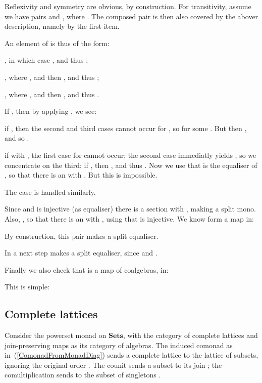 \documentclass{LMCS}
\newenvironment{myproof}[1][Proof]{ \begin{trivlist}\item[\hskip \labelsep {\bfseries #1}]}{ \end{trivlist}}
\newcommand{\Cat}[1]{\ensuremath{\mathbf{#1}}}
\newcommand{\Sets}{\Cat{Sets}\xspace}
\begin{document}
\begin{myproof}
{\noindent Reflexivity and symmetry are obvious, by construction.  For
transitivity, assume we have pairs  and ,
where . The composed pair  is then also covered by the abover description,
namely by the first item.

An element  of  is thus of the form:
\begin{iteMize}{}
\item , in which case
, and thus ;
\item , where , and then , and thus ;
\item , where , and then , and thus .
\end{iteMize}

\noindent If , then by applying , we see:
\begin{iteMize}
\item if , then the second
and third cases cannot occur for , so  for some . But then , and
so .

\item if  with , the first case for
   cannot occur; the second case immediatly yields ,
  so we concentrate on the third: if , then
  , and thus . Now we use that  is the
  equaliser of , so that there is an  with .  But
  this is impossible.

\item The case  is handled similarly.
\end{iteMize}

Since  and  is injective (as
equaliser) there is a section  with , making  a split mono. Also, , so that
there is an  with ,
using that  is injective. We know form a map  in:


\noindent By construction, this pair  makes 
a split equaliser.

In a next step  makes  a split equaliser, since  and
.

\medskip

Finally we also check that  is a map of coalgebras, in:


\noindent This is simple:

}
\end{myproof}


\subsection{Complete lattices}\label{CompleteLatticeSubsec}

Consider the powerset monad  on \Sets, with the category
 of complete lattices and join-preserving maps
as its category of algebras.  The induced comonad
 as
in~(\ref{ComonadFromMonadDiag}) sends a complete lattice  to
the lattice  of subsets, ignoring the original
order .  The counit  sends a subset 
to its join ; the comultiplication  sends  to the subset of
singletons .
\end{document}
